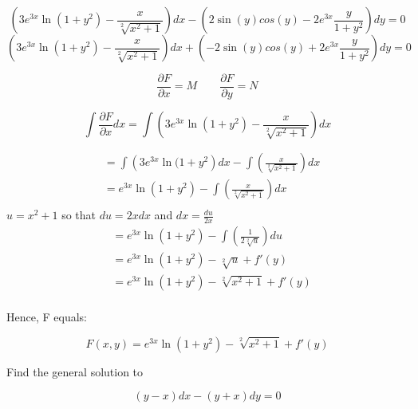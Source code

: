 \documentclass{article}
\begin{document}
    \begin{equation}
        \left( 3e^{3x}\ln{(1+y^{2})}-\frac{x}{\sqrt[2]{x^{2}+1}} \right)dx 
        -
        \left(2\sin{(y)}cos{(y)}-2e^{3x}\frac{y}{1+y^{2}}\right)dy = 0
    \end{equation}
    \begin{equation}
        \left( 3e^{3x}\ln{(1+y^{2})}-\frac{x}{\sqrt[2]{x^{2}+1}} \right)dx 
        +
        \left(-2\sin{(y)}cos{(y)}+2e^{3x}\frac{y}{1+y^{2}}\right)dy = 0
    \end{equation}

    \begin{equation}
        \frac{\partial F}{\partial x} = M 
        \qquad
        \frac{\partial F}{\partial y} = N
    \end{equation} 

    \begin{equation}
            \int \frac{\partial F}{\partial x}dx 
            = 
            \int \left( 3e^{3x}\ln{(1+y^{2})}-\frac{x}{\sqrt[2]{x^{2}+1}} \right)dx
    \end{equation}

    \newpage
    \begin{singlespace}
        
        \begin{align*} \label{eq:pareto mle2}
            &= \int \left(3e^{3x}\ln(1+y^{2}\right)dx  - \int \left(\frac{x}{\sqrt[2]{x^{2}+1}}\right)dx \\
            &= e^{3x}\ln(1+y^{2}) - \int \left(\frac{x}{\sqrt[2]{x^{2}+1}}\right)dx \\
        \end{align*}
        $u=x^{2}+1$ so that $du=2xdx$ and $dx=\frac{du}{2x}$
        \begin{align*}
            &= e^{3x}\ln(1+y^{2}) - \int \left(\frac{1}{2\sqrt[2]{u}}\right)du \\
            &= e^{3x}\ln(1+y^{2}) - \sqrt[2]{u} + f'(y) \\
            &= e^{3x}\ln(1+y^{2}) - \sqrt[2]{x^{2}+1} + f'(y) \\
        \end{align*}
        \begin{flushleft}
            Hence, F equals:
        \end{flushleft}
        \begin{equation}
            F(x, y) = e^{3x}\ln(1+y^{2}) - \sqrt[2]{x^{2}+1} + f'(y)
        \end{equation}

    \end{singlespace}

    \newpage
    \begin{flushleft}
        Find the general solution to
    \end{flushleft}

    \begin{center}
        \begin{equation}
            \left( y-x \right)dx - \left( y +x \right)dy = 0
        \end{equation}
    \end{center}
\end{document}
